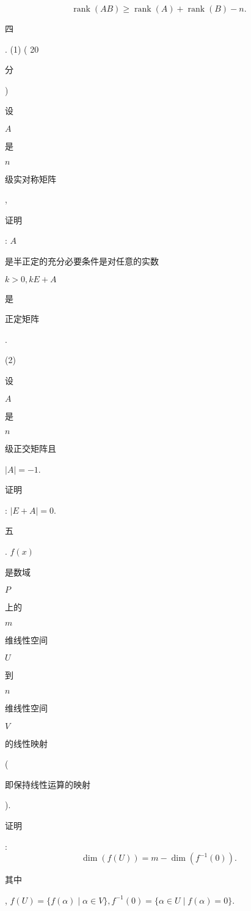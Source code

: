 \documentclass[10pt]{article}
\begin{document}
$$
\operatorname{rank}(A B) \geqslant \operatorname{rank}(A)+\operatorname{rank}(B)-n .
$$
\begin{CJK}{UTF8}{mj}四\end{CJK}. (1) ( 20 \begin{CJK}{UTF8}{mj}分\end{CJK}) \begin{CJK}{UTF8}{mj}设\end{CJK} $A$ \begin{CJK}{UTF8}{mj}是\end{CJK} $n$ \begin{CJK}{UTF8}{mj}级实对称矩阵\end{CJK}, \begin{CJK}{UTF8}{mj}证明\end{CJK}: $A$ \begin{CJK}{UTF8}{mj}是半正定的充分必要条件是对任意的实数\end{CJK} $k>0, k E+A$ \begin{CJK}{UTF8}{mj}是\end{CJK} \begin{CJK}{UTF8}{mj}正定矩阵\end{CJK}.

(2) \begin{CJK}{UTF8}{mj}设\end{CJK} $A$ \begin{CJK}{UTF8}{mj}是\end{CJK} $n$ \begin{CJK}{UTF8}{mj}级正交矩阵且\end{CJK} $|A|=-1$. \begin{CJK}{UTF8}{mj}证明\end{CJK}: $|E+A|=0$.

\begin{CJK}{UTF8}{mj}五\end{CJK}. $f(x)$ \begin{CJK}{UTF8}{mj}是数域\end{CJK} $P$ \begin{CJK}{UTF8}{mj}上的\end{CJK} $m$ \begin{CJK}{UTF8}{mj}维线性空间\end{CJK} $U$ \begin{CJK}{UTF8}{mj}到\end{CJK} $n$ \begin{CJK}{UTF8}{mj}维线性空间\end{CJK} $V$ \begin{CJK}{UTF8}{mj}的线性映射\end{CJK}(\begin{CJK}{UTF8}{mj}即保持线性运算的映射\end{CJK}). \begin{CJK}{UTF8}{mj}证明\end{CJK}:
$$
\operatorname{dim}(f(U))=m-\operatorname{dim}\left(f^{-1}(0)\right) .
$$
\begin{CJK}{UTF8}{mj}其中\end{CJK}, $f(U)=\{f(\alpha) \mid \alpha \in V\}, f^{-1}(0)=\{\alpha \in U \mid f(\alpha)=0\}$.
\end{document}
